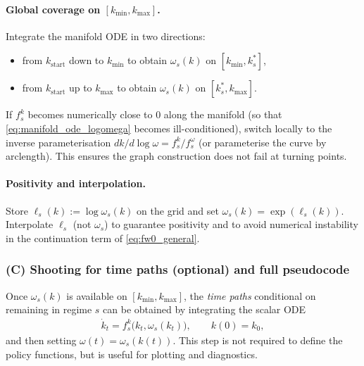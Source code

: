\documentclass{article}
\begin{document}
\paragraph{Global coverage on $[k_{\min},k_{\max}]$.}
Integrate the manifold ODE in two directions:
\begin{itemize}
\item from $k_{\mathrm{start}}$ down to $k_{\min}$ to obtain $\omega_s(k)$ on
$[k_{\min},k_s^\ast]$,
\item from $k_{\mathrm{start}}$ up to $k_{\max}$ to obtain $\omega_s(k)$ on
$[k_s^\ast,k_{\max}]$.
\end{itemize}
If $f^k_s$ becomes numerically close to $0$ along the manifold (so that
\eqref{eq:manifold_ode_logomega} becomes ill-conditioned), switch locally to the inverse
parameterisation $dk/d\log\omega = f^k_s/f^\omega_s$ (or parameterise the curve by arclength).
This ensures the graph construction does not fail at turning points.

\paragraph{Positivity and interpolation.}
Store $\ell_s(k):=\log\omega_s(k)$ on the grid and set $\omega_s(k)=\exp(\ell_s(k))$.
Interpolate $\ell_s$ (not $\omega_s$) to guarantee positivity and to avoid numerical
instability in the continuation term of \eqref{eq:fw0_general}.

\subsubsection{(C) Shooting for time paths (optional) and full pseudocode}\label{sec:numerics_pseudocode}

Once $\omega_s(k)$ is available on $[k_{\min},k_{\max}]$, the \emph{time paths} conditional
on remaining in regime $s$ can be obtained by integrating the scalar ODE
\begin{align}
\dot k_t = f^k_s\!\big(k_t,\omega_s(k_t)\big),\qquad k(0)=k_0, \label{eq:reduced_time_path}
\end{align}
and then setting $\omega(t)=\omega_s(k(t))$. This step is not required to define the
policy functions, but is useful for plotting and diagnostics.
\end{document}
